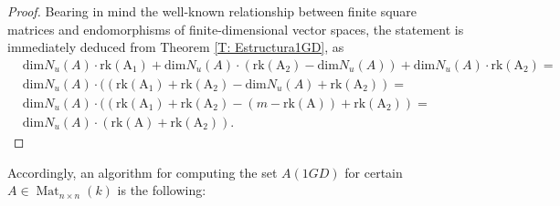 \documentclass[10pt,a4paper]{amsart}
\theoremstyle{plain}
\theoremstyle{remark}
\numberwithin{equation}{section} \numberwithin{defn}{section}
\newcommand{\Mat}{\operatorname{Mat}}
\begin{document}
\begin{proof} Bearing in mind the well-known relationship between finite square matrices and endomorphisms of finite-dimensional vector spaces, the statement is immediately deduced from Theorem \ref{T: Estructura1GD}, as \begin{align*}
& \mathrm{dim }N_{u}(A)\cdot \mathrm{rk (A_1)}+\mathrm{dim }N_u(A)\cdot( \mathrm{rk (A_2)}-\mathrm{dim }N_u(A))+\mathrm{dim }N_u(A)\cdot \mathrm{rk (A_2)}=\\ & \mathrm{dim }N_u(A)\cdot ((\mathrm{rk (A_1)}+\mathrm{rk (A_2)} -\mathrm{dim }N_u(A)+\mathrm{rk (A_2)})=\\ & \mathrm{dim }N_u(A)\cdot ((\mathrm{rk (A_1)}+\mathrm{rk (A_2)} -(m-\mathrm{rk (A)})+\mathrm{rk (A_2)})=\\ & \mathrm{dim }N_u(A)\cdot (\mathrm{rk (A)}+\mathrm{rk (A_2)}).
\end{align*} 
\end{proof}

Accordingly, an algorithm for computing the set $A(1GD)$ for certain $A\in \Mat_{n\times n}(k)$ is the following:
\end{document}
